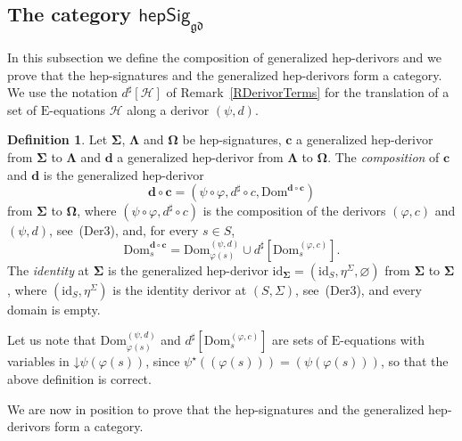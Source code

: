 \documentclass[a4paper, reqno
]{amsart}
\newcommand{\vs}[1]{\mathbin{\downarrow}#1}
\newcommand{\sig}[1]{\mathbf{#1}}             %
\newcommand{\Dom}{\mathrm{Dom}}
\newcommand{\id}{\mathrm{id}}
\newcommand{\gd}{\mathfrak{gd}}              %
\theoremstyle{plain}
\theoremstyle{definition}
\newtheorem{definition}[theorem]{Definition}
\begin{document}
\subsection{The category \texorpdfstring{$\mathsf{hepSig}_{\gd}$}{hepSiggd}}\label{SHepSigCat}

In this subsection we define the composition of generalized hep-derivors and we prove that the hep-signatures and the generalized hep-derivors form a category.
We use the notation $d^{\sharp}[\mathcal{H}]$ of Remark~\ref{RDerivorTerms} for the translation of a set of $\mathrm{E}$-equations $\mathcal{H}$ along a derivor $(\psi,d)$.

\begin{definition}\label{DHepComp}
Let $\sig{\Sigma}$, $\sig{\Lambda}$ and $\sig{\Omega}$ be hep-signatures, $\mathbf{c}$ a generalized hep-derivor from $\sig{\Sigma}$ to $\sig{\Lambda}$ and $\mathbf{d}$ a generalized hep-derivor from $\sig{\Lambda}$ to $\sig{\Omega}$.
The \emph{composition} of $\mathbf{c}$ and $\mathbf{d}$ is the generalized hep-derivor
$$
\mathbf{d}\circ\mathbf{c}=\left(\psi\circ\varphi,d^{\sharp}\circ c,\Dom^{\mathbf{d}\circ\mathbf{c}}\right)
$$
from $\sig{\Sigma}$ to $\sig{\Omega}$, where $(\psi\circ\varphi,d^{\sharp}\circ c)$ is the composition of the derivors $(\varphi,c)$ and $(\psi,d)$, see~(Der3), and, for every $s\in S$,
$$
\Dom^{\mathbf{d}\circ\mathbf{c}}_{s}=\Dom^{(\psi,d)}_{\varphi(s)}\cup d^{\sharp}\left[\Dom^{(\varphi,c)}_{s}\right].
$$
The \emph{identity} at $\sig{\Sigma}$ is the generalized hep-derivor $\id_{\sig{\Sigma}}=(\id_{S},\eta^{\Sigma},\varnothing)$ from $\sig{\Sigma}$ to $\sig{\Sigma}$, where $(\id_{S},\eta^{\Sigma})$ is the identity derivor at $(S,\Sigma)$, see~(Der3), and every domain is empty.
\end{definition}

Let us note that $\Dom^{(\psi,d)}_{\varphi(s)}$ and $d^{\sharp}[\Dom^{(\varphi,c)}_{s}]$ are sets of $\mathrm{E}$-equations with variables in $\vs{\psi(\varphi(s))}$, since $\psi^{\star}((\varphi(s)))=(\psi(\varphi(s)))$, so that the above definition is correct.

We are now in position to prove that the hep-signatures and the generalized hep-derivors form a category.
\end{document}
